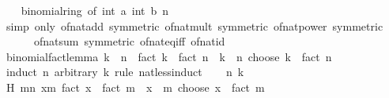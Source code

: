 \begin{isabellebody}
%
\isadelimproof
\ \ %
\endisadelimproof
%
\isatagproof
{}\isamarkupfalse%
\ binomial{\isacharunderscore}{\kern0pt}ring\ {\isacharbrackleft}{\kern0pt}of\ {\isachardoublequoteopen}int\ a{\isachardoublequoteclose}\ {\isachardoublequoteopen}int\ b{\isachardoublequoteclose}\ n{\isacharbrackright}{\kern0pt}\isanewline
\ \ \isamarkupfalse%
\ {\isacharparenleft}{\kern0pt}simp\ only{\isacharcolon}{\kern0pt}\ of{\isacharunderscore}{\kern0pt}nat{\isacharunderscore}{\kern0pt}add\ {\isacharbrackleft}{\kern0pt}symmetric{\isacharbrackright}{\kern0pt}\ of{\isacharunderscore}{\kern0pt}nat{\isacharunderscore}{\kern0pt}mult\ {\isacharbrackleft}{\kern0pt}symmetric{\isacharbrackright}{\kern0pt}\ of{\isacharunderscore}{\kern0pt}nat{\isacharunderscore}{\kern0pt}power\ {\isacharbrackleft}{\kern0pt}symmetric{\isacharbrackright}{\kern0pt}\isanewline
\ \ \ \ \ \ of{\isacharunderscore}{\kern0pt}nat{\isacharunderscore}{\kern0pt}sum\ {\isacharbrackleft}{\kern0pt}symmetric{\isacharbrackright}{\kern0pt}\ of{\isacharunderscore}{\kern0pt}nat{\isacharunderscore}{\kern0pt}eq{\isacharunderscore}{\kern0pt}iff\ of{\isacharunderscore}{\kern0pt}nat{\isacharunderscore}{\kern0pt}id{\isacharparenright}{\kern0pt}%
\endisatagproof
{\isafoldproof}%
%
\isadelimproof
\isanewline
%
\endisadelimproof
\isanewline
{}\isamarkupfalse%
\ binomial{\isacharunderscore}{\kern0pt}fact{\isacharunderscore}{\kern0pt}lemma{\isacharcolon}{\kern0pt}\ {\isachardoublequoteopen}k\ {\isasymle}\ n\ {\isasymLongrightarrow}\ fact\ k\ {\isacharasterisk}{\kern0pt}\ fact\ {\isacharparenleft}{\kern0pt}n\ {\isacharminus}{\kern0pt}\ k{\isacharparenright}{\kern0pt}\ {\isacharasterisk}{\kern0pt}\ {\isacharparenleft}{\kern0pt}n\ choose\ k{\isacharparenright}{\kern0pt}\ {\isacharequal}{\kern0pt}\ fact\ n{\isachardoublequoteclose}\isanewline
%
\isadelimproof
%
\endisadelimproof
%
\isatagproof
{}\isamarkupfalse%
\ {\isacharparenleft}{\kern0pt}induct\ n\ arbitrary{\isacharcolon}{\kern0pt}\ k\ rule{\isacharcolon}{\kern0pt}\ nat{\isacharunderscore}{\kern0pt}less{\isacharunderscore}{\kern0pt}induct{\isacharparenright}{\kern0pt}\isanewline
\ \ \isamarkupfalse%
\ n\ k\isanewline
\ \ \isamarkupfalse%
\ H{\isacharcolon}{\kern0pt}\ {\isachardoublequoteopen}{\isasymforall}m{\isacharless}{\kern0pt}n{\isachardot}{\kern0pt}\ {\isasymforall}x{\isasymle}m{\isachardot}{\kern0pt}\ fact\ x\ {\isacharasterisk}{\kern0pt}\ fact\ {\isacharparenleft}{\kern0pt}m\ {\isacharminus}{\kern0pt}\ x{\isacharparenright}{\kern0pt}\ {\isacharasterisk}{\kern0pt}\ {\isacharparenleft}{\kern0pt}m\ choose\ x{\isacharparenright}{\kern0pt}\ {\isacharequal}{\kern0pt}\ fact\ m{\isachardoublequoteclose}\isanewline

\end{isabellebody}
